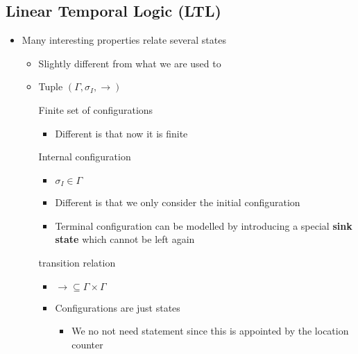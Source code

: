 \subsection{Linear Temporal Logic (LTL)}
\begin{itemize}
    \item Many interesting properties relate several states
        \begin{itemize}
            \item Slightly different from what we are used to
            \item Tuple $(\Gamma, \sigma_I, \to)$
                \begin{itemize}
                    \ides{$\mathbf{\Gamma}$:} Finite set of configurations
                        \begin{itemize}
                            \item Different is that now it is finite
                        \end{itemize}
                     Internal configuration
                        \begin{itemize}
                            \item $\sigma_I \in \Gamma$
                            \item Different is that we only consider the initial configuration
                            \item Terminal configuration can be modelled by introducing a special \textbf{sink state} which cannot be left again
                        \end{itemize}
                    \ides{$\mathbf{\to}$:} transition relation
                        \begin{itemize}
                            \item $\to \subseteq \Gamma \times \Gamma$
                        \end{itemize}
                \end{itemize}
                \begin{itemize}
                    \item Configurations are just states
                        \begin{itemize}
                            \item We no not need statement since this is appointed by the location counter
                        \end{itemize}

\end{itemize}
\end{itemize}
\end{itemize}
